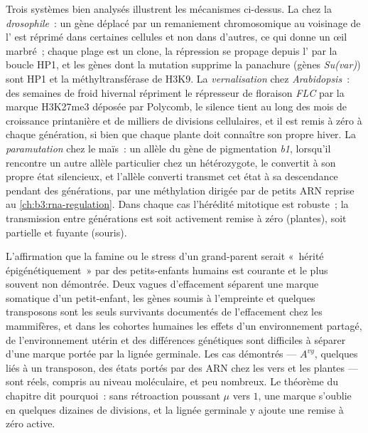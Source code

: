 \begin{proposition}\label{prop:b3:chromatin-epigenetics:examples}
Trois systèmes bien analysés illustrent les mécanismes ci-dessus. La
\emph{} chez la \emph{drosophile}~: un
gène déplacé par un remaniement chromosomique au voisinage de
l' est réprimé dans certaines cellules et non dans
d'autres, ce qui donne un œil marbré~; chaque plage est un clone, la
répression se propage depuis l' par la boucle HP1, et
les gènes dont la mutation supprime la panachure (gènes
\emph{Su(var)}) sont HP1 et la méthyltransférase de H3K9. La
\emph{vernalisation} chez \emph{Arabidopsis}~: des semaines de froid
hivernal répriment le répresseur de floraison \emph{FLC} par la marque
H3K27me3 déposée par Polycomb, le silence tient au long des mois de
croissance printanière et de milliers de divisions cellulaires, et il
est remis à zéro à chaque génération, si bien que chaque plante doit
connaître son propre hiver. La \emph{paramutation} chez le maïs~: un
allèle du gène de pigmentation \emph{b1}, lorsqu'il rencontre un autre
allèle particulier chez un hétérozygote, le convertit à son propre état
silencieux, et l'allèle converti transmet cet état à sa descendance
pendant des générations, par une méthylation dirigée par de petits ARN
reprise au \cref{ch:b3:rna-regulation}. Dans chaque cas l'hérédité
mitotique est robuste~; la transmission entre générations est soit
activement remise à zéro (plantes), soit partielle et fuyante (souris).
\end{proposition}

\begin{remark}\label{rem:b3:chromatin-epigenetics:limits}
L'affirmation que la famine ou le stress d'un grand-parent serait
«~hérité épigénétiquement~» par des petits-enfants humains est
courante et le plus souvent non démontrée. Deux vagues d'effacement
séparent une marque somatique d'un petit-enfant, les gènes soumis à
l'empreinte et quelques transposons sont les seuls survivants
documentés de l'effacement chez les mammifères, et dans les cohortes
humaines les effets d'un environnement partagé, de l'environnement
utérin et des différences génétiques sont difficiles à séparer d'une
marque portée par la lignée germinale. Les cas démontrés --- $A^{vy}$,
quelques  liés à un transposon, des états portés par des ARN
chez les vers et les plantes --- sont réels, compris au niveau
moléculaire, et peu nombreux. Le théorème du chapitre dit pourquoi~:
sans rétroaction poussant $\mu$ vers $1$, une marque s'oublie en
quelques dizaines de divisions, et la lignée germinale y ajoute une
remise à zéro active.
\end{remark}


